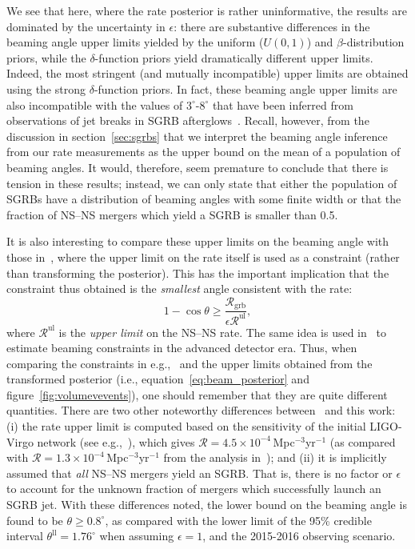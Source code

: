 \documentclass[twocolumn]{aastex61}
\newcommand{\grbrate}{{{\mathcal R}_{\mathrm{grb}}}}
\newcommand{\cbcrate}{{{\mathcal R}}}
\newcommand{\BNS}{\ac{NS}--\ac{NS}\xspace}
\begin{document}
We see that here, where the rate posterior is rather uninformative,
the results are dominated by the uncertainty in $\epsilon$: there are
substantive differences in the beaming angle upper limits yielded by
the uniform ($U(0,1)$) and $\beta$-distribution priors, while the
$\delta$-function priors yield dramatically different upper limits.
Indeed, the most stringent (and mutually incompatible) upper limits
are obtained using the strong $\delta$-function priors.  In fact,
these beaming angle upper limits are also incompatible with the values
of $3^{\circ}\mbox{-}8^{\circ}$ that have been inferred from
observations of jet breaks in \ac{SGRB}
afterglows~\cite{Fong:2013lba,2006MNRAS.367L..42P,
  2012A&A...538L...7N}.  Recall, however, from the discussion in
section~\ref{sec:sgrbs} that we interpret the beaming angle inference
from our rate measurements as the upper bound on the mean of a
population of beaming angles.  It would, therefore, seem premature to
conclude that there is tension in these results; instead, we can only
state that either the population of \acp{SGRB} have a distribution of
beaming angles with some finite width or that the fraction of \BNS
mergers which yield a \ac{SGRB} is smaller than 0.5.

It is also interesting to compare these upper limits on the beaming
angle with those in~\cite{Chen:2012qh}, where the upper limit
on the rate itself is used as a constraint (rather than transforming
the posterior).  This has the important implication that the
constraint thus obtained is the \emph{smallest} angle consistent with
the rate:
%
\begin{equation}
    1 - \cos \theta \geq \frac{\grbrate}{\epsilon \cbcrate^{\mathrm{ul}}},
\end{equation}
%
where $\cbcrate^{\mathrm{ul}}$ is the \emph{upper limit} on the \BNS
rate.  The same idea is used in~\cite{Clark:2014jpa} to estimate
beaming constraints in the advanced detector era.  Thus, when
comparing the constraints in e.g.,~\cite{Chen:2012qh} and the
upper limits obtained from the transformed posterior (i.e.,
equation~\ref{eq:beam_posterior} and figure~\ref{fig:volumevevents}), one
should remember that they are quite different quantities.  There are
two other noteworthy differences between~\cite{Chen:2012qh}
and this work: (i) the rate upper limit is computed based on the
sensitivity of the initial LIGO-Virgo network (see
e.g.,~\cite{BradyFairhurst08}), which gives $\cbcrate=4.5\times
10^{-4}$\,Mpc$^{-3}$yr$^{-1}$ (as compared with $\cbcrate=1.3 \times
10^{-4}$\,Mpc$^{-3}$yr$^{-1}$ from the analysis
in~\cite{Colaboration:2011np}); and (ii) it is implicitly assumed that
\emph{all} \BNS mergers yield an \ac{SGRB}.  That is, there is no
factor or $\epsilon$ to account for the unknown fraction of mergers
which successfully launch an \ac{SGRB} jet.  With these differences
noted, the lower bound on the beaming angle is found to be $\theta
\geq 0.8^{\circ}$, as compared with the lower limit of the 95\%
credible interval $\theta^{\mathrm{ll}}=1.76^{\circ}$ when assuming
$\epsilon=1$, and the 2015-2016 observing scenario.
\end{document}
